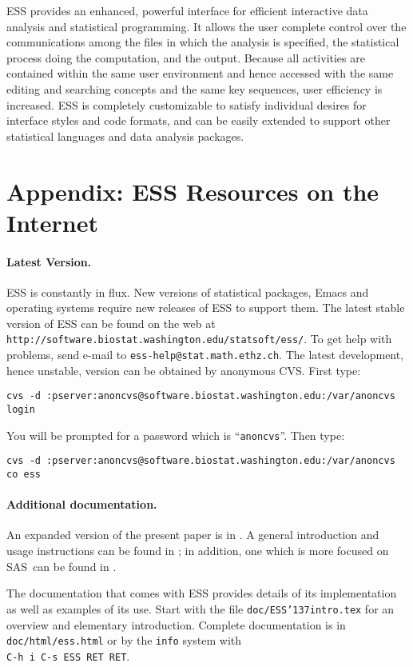 \documentclass{article}
\def\url#1{\stexttt{#1}} %
\newcommand*{\SAS}{\textsc{SAS}}
\newcommand{\stexttt}[1]{{\small\texttt{#1}}}
\newcommand{\US}{{\char'137}}        %
\begin{document}
ESS provides an enhanced, powerful interface for efficient interactive
data analysis and statistical programming.  It allows the user
complete control over the communications among the files in which the
analysis is specified, the statistical process doing the computation,
and the output.  Because all activities are contained within the same
user environment and hence accessed with the same editing and
searching concepts and the same key sequences, user efficiency is
increased.  ESS is completely customizable to satisfy individual
desires for interface styles and code formats, and can be easily
extended to support other statistical languages and data analysis
packages.




\clearpage

\appendix
\section{Appendix: ESS Resources on the Internet}
\label{sec:access}

\paragraph{Latest Version.}

ESS is constantly in flux.  New versions of statistical packages,
Emacs and operating systems require new releases of ESS to support
them.  The latest stable version of ESS can be found on the web at
\url{http://software.biostat.washington.edu/statsoft/ess/}.  To get
help with problems, send e-mail to \url{ess-help@stat.math.ethz.ch}.
The latest development, hence unstable, version can be obtained by
anonymous CVS.  First type:

\stexttt{cvs -d
  :pserver:anoncvs@software.biostat.washington.edu:/var/anoncvs login}

You will be prompted for a password which is ``\stexttt{anoncvs}''.
Then type:

\stexttt{cvs -d
  :pserver:anoncvs@software.biostat.washington.edu:/var/anoncvs co
  ess}

\paragraph{Additional documentation.}

An expanded version of the present paper is in \citep{RMHHS:2001}.  A
general introduction and usage instructions can be found in
\citep{heiberger:dsc:2001}; in addition, one which is more focused on
\SAS\ can be found in \citep{heiberger:philasugi:2001}.

The documentation that comes with ESS provides details of its
implementation as well as examples of its use.  Start with the file
\stexttt{doc/ESS{\US}intro.tex} for an overview and elementary
introduction.  Complete documentation is in
\stexttt{doc/html/ess.html} or by the \stexttt{info} system with\\
\stexttt{C-h i C-s ESS RET RET}.
\end{document}
